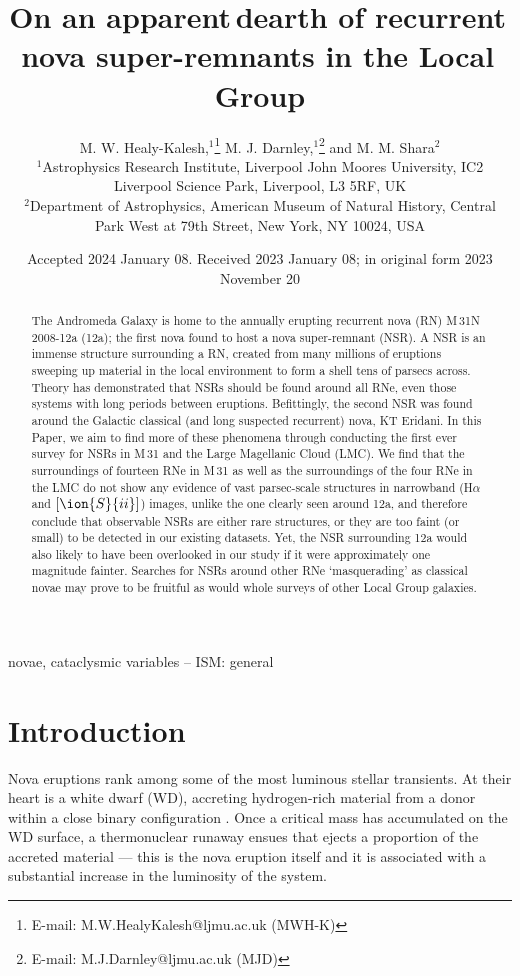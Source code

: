 \documentclass[fleqn,usenatbib]{mnras}
\title[Apparent dearth of NSRs in the Local Group]{On an apparent\,dearth of recurrent\,nova super-remnants in the Local\,Group}
\author[M. W. Healy-Kalesh et al.]{M. W. Healy-Kalesh,$^{1}$\thanks{E-mail: M.W.HealyKalesh@ljmu.ac.uk (MWH-K)} M. J. Darnley,$^{1}$\thanks{E-mail: M.J.Darnley@ljmu.ac.uk (MJD)} and M. M. Shara$^{2}$
\\
$^{1}$Astrophysics Research Institute, Liverpool John Moores University, IC2 Liverpool Science Park, Liverpool, L3 5RF, UK\\
$^{2}$Department of Astrophysics, American Museum of Natural History, Central Park West at 79th Street, New York, NY 10024, USA\\
}
\date{Accepted 2024 January 08. Received 2023 January 08; in original form 2023 November 20}
\begin{document}
\label{firstpage}
\pagerange{\pageref{firstpage}--\pageref{lastpage}}
\maketitle

\begin{abstract}
The Andromeda Galaxy is home to the annually erupting recurrent nova (RN) M\,31N 2008-12a (12a); the first nova found to host a nova super-remnant (NSR). A NSR is an immense structure surrounding a RN, created from many millions of eruptions sweeping up material in the local environment to form a shell tens of parsecs across. Theory has demonstrated that NSRs should be found around all RNe, even those systems with long periods between eruptions. Befittingly, the second NSR was found around the Galactic classical (and long suspected recurrent) nova, KT Eridani. In this Paper, we aim to find more of these phenomena through conducting the first ever survey for NSRs in M\,31 and the Large Magellanic Cloud (LMC). We find that the surroundings of fourteen RNe in M\,31 as well as the surroundings of the four RNe in the LMC do not show any evidence of vast parsec-scale structures in narrowband (H$\alpha$ and $[\ion{S}{ii}]$) images, unlike the one clearly seen around 12a, and therefore conclude that observable NSRs are either rare structures, or they are too faint (or small) to be detected in our existing datasets. Yet, the NSR surrounding 12a would also likely to have been overlooked in our study if it were approximately one magnitude fainter. Searches for NSRs around other RNe `masquerading' as classical novae may prove to be fruitful as would whole surveys of other Local Group galaxies.
\end{abstract}

\begin{keywords}
novae, cataclysmic variables -- ISM: general
\end{keywords}

\section{Introduction}

Nova eruptions rank among some of the most luminous stellar transients. At their heart is a white dwarf (WD), accreting hydrogen-rich material from a donor within a close binary configuration \citep{1995cvs..book.....W}. Once a critical mass has accumulated on the WD surface, a thermonuclear runaway ensues that ejects a proportion of the accreted material \citep{1972ApJ...176..169S,1978A&A....62..339P} --- this is the nova eruption itself and it is associated with a substantial increase in the luminosity of the system.
\end{document}
